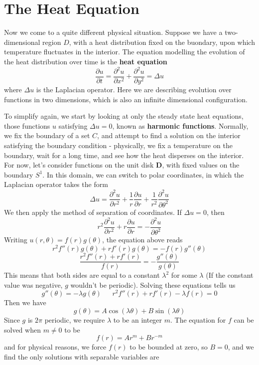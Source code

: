 \section{The Heat Equation}

Now we come to a quite different physical situation. Suppose we have a two-dimensional region $D$, with a heat distribution fixed on the buondary, upon which temperature fluctuates in the interior. The equation modelling the evolution of the heat distribution over time is the {\bf heat equation}
%
\[ \frac{\partial u}{\partial t} = \frac{\partial^2 u}{\partial x^2} + \frac{\partial^2 u}{\partial y^2} = \Delta u \]
%
where $\Delta u$ is the Laplacian operator. Here we are describing evolution over functions in two dimensions, which is also an infinite dimensional configuration.

To simplify again, we start by looking at only the steady state heat equations, those functions $u$ satisfying $\Delta u = 0$, known as {\bf harmonic functions}. Normally, we fix the boundary of a set $C$, and attempt to find a solution on the interior satisfying the boundary condition - physically, we fix a temperature on the boundary, wait for a long time, and see how the heat disperses on the interior. For now, let's consider functions on the unit disk $\mathbf{D}$, with fixed values on the boundary $S^1$. In this domain, we can switch to polar coordinates, in which the Laplacian operator takes the form
%
\[ \Delta u = \frac{\partial^2 u}{\partial r^2} + \frac{1}{r} \frac{\partial u}{\partial r} + \frac{1}{r^2} \frac{\partial^2 u}{\partial \theta^2} \]
%
We then apply the method of separation of coordinates. If $\Delta u = 0$, then
%
\[ r^2 \frac{\partial^2 u}{\partial r^2} + r \frac{\partial u}{\partial r} = - \frac{\partial^2 u}{\partial \theta^2} \]
%
Writing $u(r,\theta) = f(r)g(\theta)$, the equation above reads
%
\[ r^2 f''(r) g(\theta) + r f'(r) g(\theta) = - f(r) g''(\theta) \]
%
\[ \frac{r^2 f''(r) + r f'(r)}{f(r)} = - \frac{g''(\theta)}{g(\theta)} \]
%
This means that both sides are equal to a constant $\lambda^2$ for some $\lambda$ (If the constant value was negative, $g$ wouldn't be periodic). Solving these equations tells us
%
\[ g''(\theta) = - \lambda g(\theta)\ \ \ \ \ \ \ r^2 f''(r) + r f'(r) - \lambda f(r) = 0 \]
%
Then we have
%
\[ g(\theta) = A \cos(\lambda \theta) + B \sin(\lambda \theta) \]
%
Since $g$ is $2\pi$ periodic, we require $\lambda$ to be an integer $m$. The equation for $f$ can be solved when $m \neq 0$ to be
%
\[ f(r) = A r^m + B r^{-m} \]
%
and for physical reasons, we force $f(r)$ to be bounded at zero, so $B = 0$, and we find the only solutions with separable variables are
